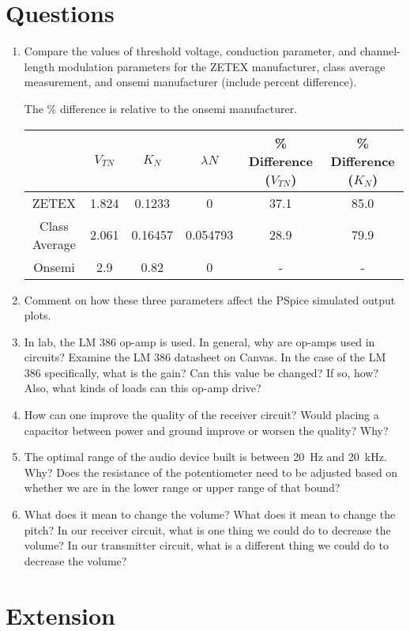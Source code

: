 \documentclass[12pt]{article}
\begin{document}
\section{Questions}
\begin{enumerate}
\item Compare the values of threshold voltage, conduction parameter, and channel-length modulation parameters for the ZETEX manufacturer, class average measurement, and onsemi manufacturer (include percent difference).

The \% difference is relative to the onsemi manufacturer.

\begin{table}[h]
    \centering
    \begin{tabular}{|c|c|c|c|c|c|}
    \hline
    & $V_{TN}$ & $K_N$ & $\lambda N$ & \% Difference ($V_{TN}$) & \% Difference ($K_N$) \\ \hline
    ZETEX & 1.824 & 0.1233 & 0 & 37.1 & 85.0 \\ \hline
    Class Average & 2.061 & 0.16457 & 0.054793 & 28.9 & 79.9 \\ \hline
    Onsemi & 2.9 & 0.82 & 0 & - & - \\ \hline
    \end{tabular}
\end{table}


\item Comment on how these three parameters affect the PSpice simulated output plots.



\item In lab, the LM 386 op-amp is used. In general, why are op-amps used in circuits? Examine the LM 386 datasheet on Canvas. In the case of the LM 386 specifically, what is the gain? Can this value be changed? If so, how? Also, what kinds of loads can this op-amp drive? 



\item How can one improve the quality of the receiver circuit? Would placing a capacitor between power and ground improve or worsen the quality? Why?



\item The optimal range of the audio device built is between \SI{20}{\hertz} and \SI{20}{\kilo\hertz}.  Why? Does the resistance of the potentiometer need to be adjusted based on whether we are in the lower range or upper range of that bound?



\item What does it mean to change the volume? What does it mean to change the pitch? In our receiver circuit, what is one thing we could do to decrease the volume? In our transmitter circuit, what is a different thing we could do to decrease the volume?



\end{enumerate}

\section{Extension}
\end{document}
